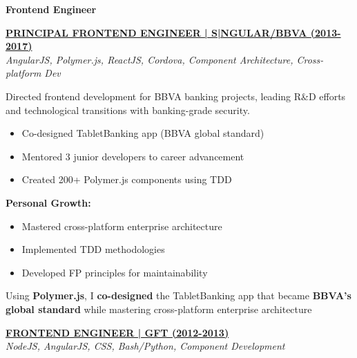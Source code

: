 \documentclass[a4paper,10pt]{article}
\begin{document}
    \vspace{0.5cm}
    \noindent
    \begin{minipage}{\textwidth}
        {\large\bfseries\color{darkblue}\selectfont Frontend Engineer}
        \vspace{0.3cm}

    \noindent\uline{\textbf{PRINCIPAL FRONTEND ENGINEER | S|NGULAR/BBVA (2013-2017)}} \\
	\vspace{0.1cm}
	{\small\textit{AngularJS, Polymer.js, ReactJS, Cordova, Component Architecture, Cross-platform Dev}}
	\vspace{0.2cm}

	Directed frontend development for BBVA banking projects, leading R\&D efforts and technological transitions with banking-grade security.

	\vspace{0.2cm}
	\begin{itemize}[label=\textcolor{darkblue}{\textbullet}, leftmargin=*, nosep]
		\item Co-designed TabletBanking app (BBVA global standard)
		\item Mentored 3 junior developers to career advancement
		\item Created 200+ Polymer.js components using TDD
	\end{itemize}

	\vspace{0.2cm}
	\textbf{Personal Growth:}
	\vspace{0.2cm}
	\begin{itemize}[label=\textcolor{darkblue}{\textbullet}, leftmargin=*, nosep]
		\item Mastered cross-platform enterprise architecture
		\item Implemented TDD methodologies
		\item Developed FP principles for maintainability
	\end{itemize}

    \vspace{0.2cm}

    Using \textbf{Polymer.js}, I \textbf{co-designed} the TabletBanking app that became \textbf{BBVA's global standard} while mastering cross-platform enterprise architecture


	\vspace{0.4cm}

    \noindent\uline{\textbf{FRONTEND ENGINEER | GFT (2012-2013)}} \\
	\vspace{0.1cm}
	{\small\textit{NodeJS, AngularJS, CSS, Bash/Python, Component Development}}
	\vspace{0.2cm}


\end{minipage}
\end{document}
